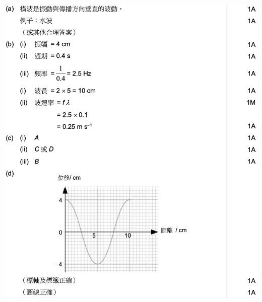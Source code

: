 {
}{
    \clearpage\sol\par{\par\centering\includegraphics[width=\textwidth]{./img/ch1_earlyclass_wave_lq_2024-05-13-13-17-35.png}\par}
}

